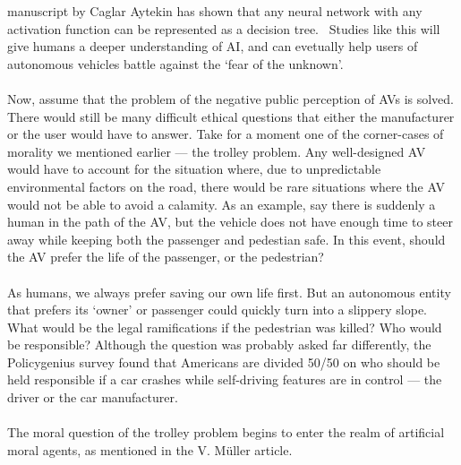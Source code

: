 \documentclass[12pt]{article}
\newcommand{\supercite}[1]{~{\textsuperscript{\cite{#1}}}}
\begin{document}
manuscript by Caglar Aytekin has shown that any neural network with any activation
function can be represented as a decision tree.\supercite{caglar-nn-dt} Studies 
like this will give humans a deeper understanding of AI, and can evetually help
users of autonomous vehicles battle against the `fear of the unknown'.\\
\vspace{0in}\\
Now, assume that the problem of the negative public perception of AVs
is solved. There would still be many difficult ethical questions that either the
manufacturer or the user would have to answer. Take for a moment one of the corner-cases
of morality we mentioned earlier --- the trolley problem. Any well-designed AV
would have to account for the situation where, due to unpredictable environmental
factors on the road, there would be rare situations where the AV would not be
able to avoid a calamity. As an example, say there is suddenly a human in the path
of the AV, but the vehicle does not have enough time to steer away while keeping
both the passenger and pedestian safe. In this event, should the AV prefer the life
of the passenger, or the pedestrian?\\
\vspace{0in}\\
As humans, we always prefer saving our own life first. But an autonomous
entity that prefers its `owner' or passenger could quickly turn into a slippery
slope. What would be the legal ramifications if the pedestrian was killed?
Who would be responsible? Although the question was probably asked far
differently, the Policygenius survey found that Americans are divided 50/50
on who should be held responsible if a car crashes while self-driving 
features are in control — the driver or the car manufacturer.\supercite{policy-genius-survey}\\
\vspace{0in}\\
The moral question of the trolley problem begins to enter the realm of artificial
moral agents, as mentioned in the V. Müller article.\supercite{sep-ethics-ai}
\pagebreak



\end{document}
